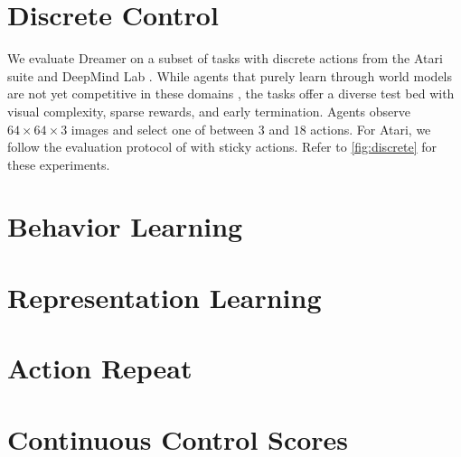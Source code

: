 \pagebreak
\section{Discrete Control}
\label{sec:discrete}

We evaluate Dreamer on a subset of tasks with discrete actions from the Atari suite \citep{bellemare2013ale} and DeepMind Lab \citep{beattie2016dmlab}. While agents that purely learn through world models are not yet competitive in these domains \citep{kaiser2019simple}, the tasks offer a diverse test bed with visual complexity, sparse rewards, and early termination. Agents observe $64\times64\times3$ images and select one of between $3$ and $18$ actions. For Atari, we follow the evaluation protocol of \citet{machado2018stickyactions} with sticky actions. Refer to \cref{fig:discrete} for these experiments.



\clearpage
\section{Behavior Learning}
\label{sec:value-all}


\clearpage
\section{Representation Learning}
\label{sec:repr-all}


\clearpage
\section{Action Repeat}


\clearpage
\section{Continuous Control Scores}

